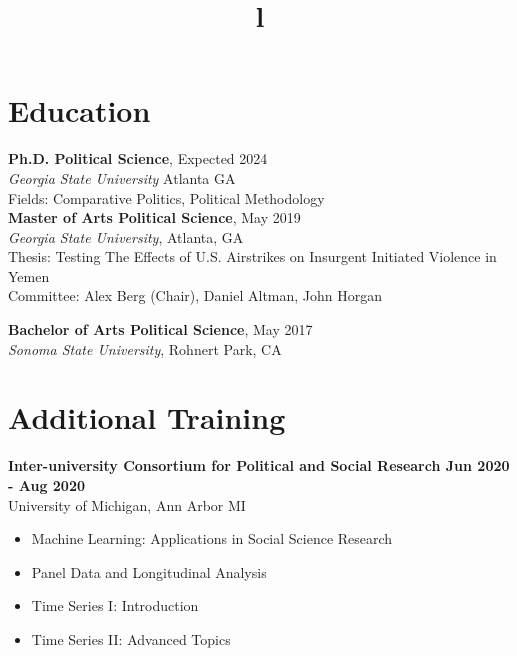 \documentclass[margin]{res}
\newcommand{\fullhrulefill}{%
  \hspace*{-\sectionwidth}\hrulefill%
  }
\begin{document}
\begin{resume}

\fullhrulefill
\section{Education}
\textbf {Ph.D. Political Science}, Expected 2024 \\
{\sl Georgia State University} Atlanta GA \\
{Fields: Comparative Politics, Political Methodology} \\

\textbf{Master of Arts Political Science}, May 2019\\
{\sl Georgia State University}, Atlanta, GA\\
 Thesis: Testing The Effects of U.S. Airstrikes on Insurgent Initiated Violence in Yemen  \\
Committee: Alex Berg (Chair), Daniel Altman, John Horgan

\textbf{Bachelor of Arts Political Science}, May 2017 \\
{\sl Sonoma State University}, Rohnert Park, CA


\fullhrulefill
\section{Additional Training}
\textbf{Inter-university Consortium for Political and Social Research \hfill{Jun 2020 - Aug 2020}}\\ University of Michigan, Ann Arbor MI \\ 
\begin{itemize}
	\item Machine Learning: Applications in Social Science Research
	\item Panel Data and Longitudinal Analysis
	\item Time Series I: Introduction
	\item Time Series II: Advanced Topics
\end{itemize}

\begin{format}
\title{l}\\
\\
\body\\
\end{format}


\end{resume}
\end{document}
